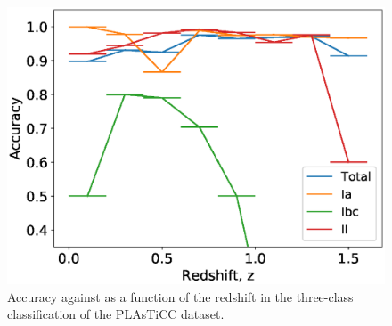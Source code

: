 \documentclass[proof]{pasj01}
\providecommand{\DIFadd}[1]{{\protect\color{blue} \sf #1}} %
\providecommand{\DIFdel}[1]{{\protect\color{red} \scriptsize #1}} %
\providecommand{\DIFaddFL}[1]{\DIFadd{#1}} %
\providecommand{\DIFdelFL}[1]{\DIFdel{#1}} %
\providecommand{\DIFaddbeginFL}{} %
\providecommand{\DIFaddendFL}{} %
\providecommand{\DIFdelbeginFL}{} %
\providecommand{\DIFdelendFL}{} %
\newcommand{\DIFscaledelfig}{0.5}
\newlength{\DIFdelgraphicswidth} %
\newlength{\DIFdelgraphicsheight} %
\newcommand{\DIFaddincludegraphics}[2][]{{\color{blue}\fbox{\DIFOincludegraphics[#1]{#2}}}} %
\newcommand{\DIFdelincludegraphics}[2][]{%
\sbox{\DIFdelgraphicsbox}{\DIFOincludegraphics[#1]{#2}}%
\settoboxwidth{\DIFdelgraphicswidth}{\DIFdelgraphicsbox} %
\settoboxtotalheight{\DIFdelgraphicsheight}{\DIFdelgraphicsbox} %
\scalebox{\DIFscaledelfig}{%
\parbox[b]{\DIFdelgraphicswidth}{\usebox{\DIFdelgraphicsbox}\\[-\baselineskip] \rule{\DIFdelgraphicswidth}{0em}}\llap{\resizebox{\DIFdelgraphicswidth}{\DIFdelgraphicsheight}{%
\setlength{\unitlength}{\DIFdelgraphicswidth}%
\begin{picture}(1,1)%
\thicklines\linethickness{2pt} %
{\color[rgb]{1,0,0}\put(0,0){\framebox(1,1){}}}%
{\color[rgb]{1,0,0}\put(0,0){\line( 1,1){1}}}%
{\color[rgb]{1,0,0}\put(0,1){\line(1,-1){1}}}%
\end{picture}%
}\hspace*{3pt}}} %
} %
\DeclareRobustCommand{\DIFaddbeginFL}{\DIFOaddbeginFL \let\includegraphics\DIFaddincludegraphics} %
\DeclareRobustCommand{\DIFaddendFL}{\DIFOaddendFL \let\includegraphics\DIFOincludegraphics} %
\DeclareRobustCommand{\DIFdelbeginFL}{\DIFOdelbeginFL \let\includegraphics\DIFdelincludegraphics} %
\DeclareRobustCommand{\DIFdelendFL}{\DIFOaddendFL \let\includegraphics\DIFOincludegraphics} %
\begin{document}
\begin{figure}[htbp]
  \begin{center}
     \includegraphics[width=\columnwidth]{figures/misclass_rate_plastic_3class.eps}
  \end{center}
  \caption{%
  Accuracy \DIFdelbeginFL \DIFdelFL{against }\DIFdelendFL \DIFaddbeginFL \DIFaddFL{as a function of the }\DIFaddendFL redshift in the three-class classification of the PLAsTiCC dataset.
  }%
  \label{fig:misclass_rate_3class}
\end{figure}

\end{document}

